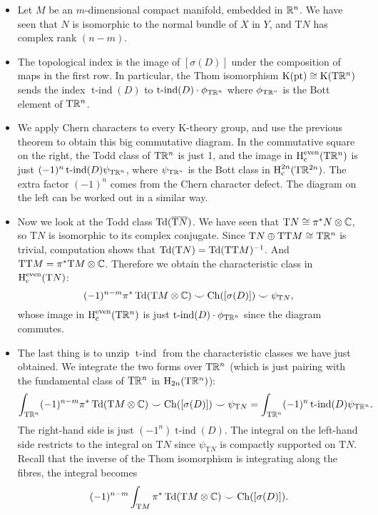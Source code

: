 \documentclass[reqno]{scrartcl}
\theoremstyle{definition}
\theoremstyle{remark}
\newcommand{\tind}{\operatorname{t-ind}}
\newcommand{\Hc}{\operatorname{H}_{\mathrm{c}}} %
\renewcommand{\cup}{\smile}
\begin{document}
\begin{itemize}
\item Let $M$ be an $m$-dimensional compact manifold, embedded in $\mathbb{R}^n$. We have seen that $N$ is isomorphic to the normal bundle of $X$ in $Y$, and $\mathrm{T}N$ has complex rank $(n-m)$.
\item The topological index is the image of $[\sigma(D)]$ under the composition of maps in the first row. In particular, the Thom isomorphism $\operatorname{K}(\operatorname{pt})\cong\operatorname{K}(\mathrm{T}\mathbb{R}^n)$ sends the index $\tind(D)$ to $\tind(D)\cdot\phi_{\mathrm{T}\R^n}$ where $\phi_{\mathrm{T}\mathbb{R}^n}$ is the Bott element of $\mathrm{T}\mathbb{R}^n$.
\item We apply Chern characters to every K-theory group, and use the previous theorem to obtain this big commutative diagram. In the commutative square on the right, the Todd class of $\mathrm{T}\mathbb{R}^n$ is just 1, and the image in $\Hc^\even(\mathrm{T}\R^n)$ is just $(-1)^n\tind(D)\psi_{\mathrm{T}\R^n}$, where $\psi_{\mathrm{T}\mathbb{R}^n}$ is the Bott
 class in $\Hc^{2n}(\mathrm{T}\R^{2n})$. The extra factor $(-1)^n$ comes from the Chern character defect. The diagram on the left can be worked out in a similar way.
\item Now we look at the Todd class $\operatorname{Td}(\overline{\mathrm{T}N})$. We have seen that $\mathrm{T}N\cong\pi^*N\otimes\mathbb{C}$, so $\mathrm{T}N$ is isomorphic to its complex conjugate. Since $\mathrm{T}N\oplus \mathrm{TT}M\cong \mathrm{T}\mathbb{R}^n$ is trivial, computation shows that $\operatorname{Td}(\mathrm{T}N)=\operatorname{Td}(\mathrm{TT}M)^{-1}$. And $\mathrm{TT}M=\pi^*\mathrm{T}M\otimes\mathbb{C}$. Therefore we obtain the characteristic class in $\Hc^\even(\mathrm{T}N)$:
\[ (-1)^{n-m}\pi^*\Td(\mathrm{T}M\otimes\C)\cup\Ch([\sigma(D)])\cup\psi_{\mathrm{T}N}, \]
whose image in $\Hc^\even(\mathrm{T}\R^n)$ is just $\tind(D)\cdot\phi_{\mathrm{T}\R^n}$ since the diagram commutes.
\item The last thing is to unzip $\tind$ from the characteristic classes we have just obtained. We integrate the two forms 
over $\mathrm{T}\mathbb{R}^n$ (which is just pairing with the fundamental class of $\mathrm{T}\mathbb{R}^n$ in $\mathrm{H}_{2n}(\mathrm{T}\mathbb{R}^n)$):
\[ \int_{\mathrm{T}\R^n}(-1)^{n-m}\pi^*\Td(\mathrm{T}M\otimes\C)\cup\Ch([\sigma(D)])\cup\psi_{\mathrm{T}N}=\int_{\mathrm{T}\R^n}(-1)^n\tind(D)\psi_{\mathrm{T}\R^n}. \]
The right-hand side is just $(-1^n)\tind(D)$. The integral on the left-hand side restricts to the integral on $\mathrm{T}N$ since $\psi_{\mathrm{T}N}$ is compactly supported on $\mathrm{T}N$. Recall that the inverse of the Thom isomorphism is integrating along the fibres, the integral becomes
\[ (-1)^{n-m}\int_{\mathrm{T}M}\pi^*\Td(\mathrm{T}M\otimes\C)\cup\Ch([\sigma(D)]). \]
\end{itemize}
\end{document}
